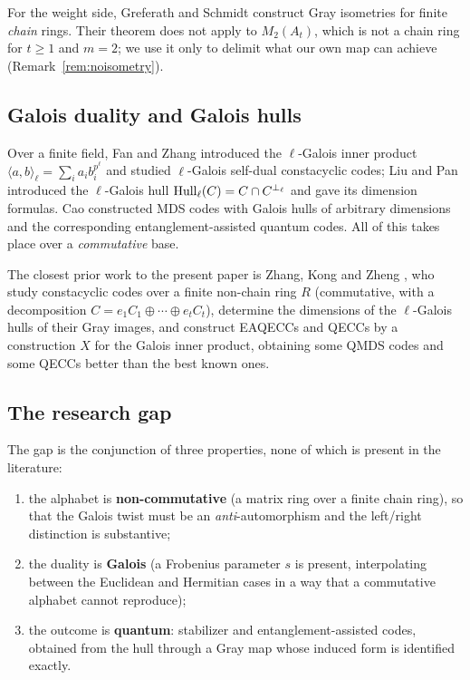 For the weight side, Greferath and Schmidt \cite{GreferathSchmidt1999GrayIsometry}
construct Gray isometries for finite \emph{chain} rings. Their theorem does not
apply to $M_2(A_t)$, which is not a chain ring for $t\ge1$ and $m=2$; we use it
only to delimit what our own map can achieve (Remark~\ref{rem:noisometry}).

\subsection{Galois duality and Galois hulls}

Over a finite field, Fan and Zhang \cite{FanZhang2017GaloisSelfDual} introduced
the $\ell$-Galois inner product $\langle a,b\rangle_\ell=\sum_i a_ib_i^{p^\ell}$
and studied $\ell$-Galois self-dual constacyclic codes; Liu and Pan
\cite{LiuPan2020GaloisHulls} introduced the $\ell$-Galois hull
$\operatorname{Hull}_\ell(C)=C\cap C^{\perp_\ell}$ and gave its dimension formulas. Cao
\cite{Cao2021MDSGaloisHulls} constructed MDS codes with Galois hulls of
arbitrary dimensions and the corresponding entanglement-assisted quantum codes.
All of this takes place over a \emph{commutative} base.

The closest prior work to the present paper is Zhang, Kong and Zheng
\cite{ZhangKongZheng2026QuantumGaloisHulls}, who study constacyclic codes over a
finite non-chain ring $R$ (commutative, with a decomposition
$C=e_1C_1\oplus\cdots\oplus e_tC_t$), determine the dimensions of the
$\ell$-Galois hulls of their Gray images, and construct EAQECCs and QECCs by a
construction $X$ for the Galois inner product, obtaining some QMDS codes and
some QECCs better than the best known ones.

\subsection{The research gap}

The gap is the conjunction of three properties, none of which is present in the
literature:

\begin{enumerate}[label=\textnormal{(\arabic*)},leftmargin=*]
\item the alphabet is \textbf{non-commutative} (a matrix ring over a finite
  chain ring), so that the Galois twist must be an \emph{anti}-automorphism and
  the left/right distinction is substantive;
\item the duality is \textbf{Galois} (a Frobenius parameter $s$ is present,
  interpolating between the Euclidean and Hermitian cases in a way that a
  commutative alphabet cannot reproduce);
\item the outcome is \textbf{quantum}: stabilizer and entanglement-assisted
  codes, obtained from the hull through a Gray map whose induced form is
  identified exactly.
\end{enumerate}

